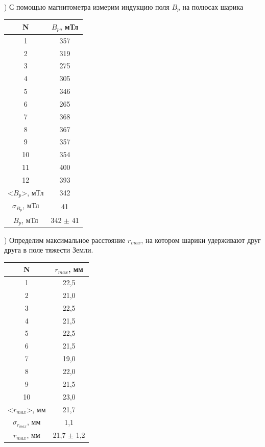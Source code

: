 \documentclass[a4paper,12pt]{article}
\begin{document}
) С помощью магнитометра измерим индукцию поля $B_p$ на полюсах шарика 

\begin{center}
\begin{tabular}{|c|c|}
	\hline
	N & $B_p$, мТл \\
	\hline
	1 & 357 \\
	\hline
	2 & 319 \\
	\hline
	3 & 275 \\
	\hline
	4 & 305 \\
	\hline
	5 & 346 \\
	\hline
	6 & 265 \\
	\hline
	7 & 368 \\
	\hline
	8 & 367 \\
	\hline
	9 & 357 \\
	\hline
	10 & 354 \\
	\hline
	11 & 400 \\
	\hline
	12 & 393 \\
	\hline
	<$B_p$>, мТл & 342 \\
	\hline
	$\sigma_{B_p}$, мТл & 41 \\
	\hline
	$B_p$, мТл & 342 $\pm$ 41 \\
	\hline
\end{tabular}
\end{center}

) Определим максимальное расстояние $r_{max}$, на котором шарики удерживают друг друга в поле тяжести Земли.

\begin{center}
\begin{tabular}{|c|c|}
	\hline
	N & $r_{max}$, мм \\
	\hline
	1 & 22,5 \\
	\hline
	2 & 21,0 \\
	\hline
	3 & 22,5 \\
	\hline
	4 & 21,5 \\
	\hline
	5 & 22,5 \\
	\hline
	6 & 21,5 \\
	\hline
	7 & 19,0 \\
	\hline
	8 & 22,0 \\
	\hline
	9 & 21,5 \\
	\hline
	10 & 23,0 \\
	\hline
	<$r_{max}$>, мм & 21,7 \\
	\hline
	$\sigma_{r_{max}}$, мм & 1,1\\
	\hline
	$r_{max}$, мм & 21,7 $\pm$ 1,2 \\
	\hline
\end{tabular}
\end{center}
\end{document}
